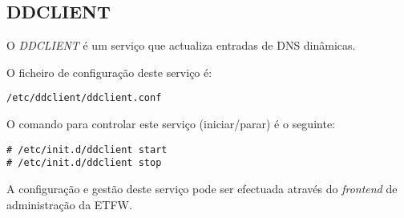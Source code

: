 \subsection{DDCLIENT}

O \emph{DDCLIENT} é um serviço que actualiza entradas de DNS dinâmicas.

O ficheiro de configuração deste serviço é:

\begin{Verbatim}[commandchars=\\\{\}]
/etc/ddclient/ddclient.conf
\end{Verbatim}

O comando para controlar este serviço (iniciar/parar) é o seguinte:

\begin{Verbatim}[commandchars=\\\{\}]
# /etc/init.d/ddclient start
# /etc/init.d/ddclient stop
\end{Verbatim}

A configuração e gestão deste serviço pode ser efectuada através do \textit{frontend} de administração da ETFW.
